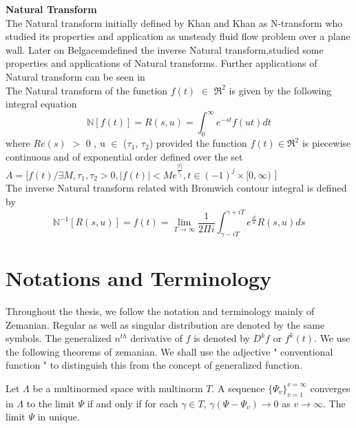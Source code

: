 \begin{large}
\textbf{Natural Transform}\\
The Natural transform initially defined by Khan and Khan\cite{R51} as N-transform who studied its properties and application as unsteady fluid flow problem over a plane wall. Later on Belgacem\cite{R12,R13}defined the inverse Natural transform,studied some properties and applications of Natural transforms. Further applications of Natural transform can be seen in \cite{R12,R24,R25}\\
The Natural transform of the function $f(t)$ $\in$ $\Re^{2}$ is given by the following integral equation \cite{R13}
\begin{equation}
\mathbb{N}[f(t)] = R(s,u) = \int_{0}^{\infty}e^{-st}f(ut)dt 
 \end{equation} 
 where $Re(s)$ $>$ 0 , u $\in$ ($\tau_{1}$, $\tau_{2}$)
 provided the function $f(t)\in\Re^{2}$ is  piecewise continuous and of exponential order defined over the set
 $A=[f(t)/\exists M,\tau_{1}, \tau_{2} > 0 ,|f(t)| < M e^{\frac{|t|}{\tau_{j}}} ,  t \in(-1)^{j}\times[0,\infty)$ ]\\
 The inverse Natural transform related with Bromwich contour integral\cite{R12,R13} is defined by
 \begin{equation}
 \mathbb{N}^{-1}[R(s,u)] = f(t) = \lim _{T\rightarrow\infty} \frac{1}{2\Pi i}\int_{\gamma-iT}^{\gamma+iT}e^{\frac{st}{u}}R(s, u)ds
 \end{equation}
 
\section{Notations and Terminology}
Throughout the thesis, we follow the notation and terminology mainly of Zemanian\cite{R97,R98}. Regular as well as singular distribution are denoted by the same symbols. The generalized $n^{th}$ derivative of $ f $ is denoted by $ D^{k}f $ or $ f^{k}(t) $. We use the following theorems of zemanian\cite{R97}. We shall use the adjective " conventional function " to distinguish this from the concept of generalized function.

\begin{lemma}
Let $\Lambda$ be a multinormed space with multinorm $T$. A sequence $\lbrace \Psi_{v}\rbrace_{v=1}^{v=\infty}$ converges in $ \Lambda $ to the limit $ \Psi $ if and only if for each $\gamma\in T$,  $ \gamma(\Psi-\Psi_{v}) \rightarrow 0 $ as $v\rightarrow \infty.$ The limit $ \Psi $ in unique.
\end{lemma}


\end{large}
